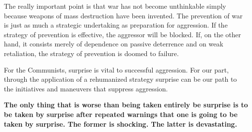The really important point is that war has not become unthinkable simply because weapons of mass destruction have been invented. The prevention of war is just as much a strategic undertaking as preparation for aggression. If the strategy of prevention is effective, the aggressor will be blocked. If, on the other hand, it consists merely of dependence on passive deterrence and on weak retaliation, the strategy of prevention is doomed to failure.

For the Communists, surprise is vital to successful aggression. For our part, through the application of a rehumanized strategy surprise can be our path to the initiatives and maneuvers that suppress aggression.

\textbf{The only thing that is worse than being taken entirely be surprise is to be taken by surprise after repeated warnings that one is going to be taken by surprise. The former is shocking. The latter is devastating.}
